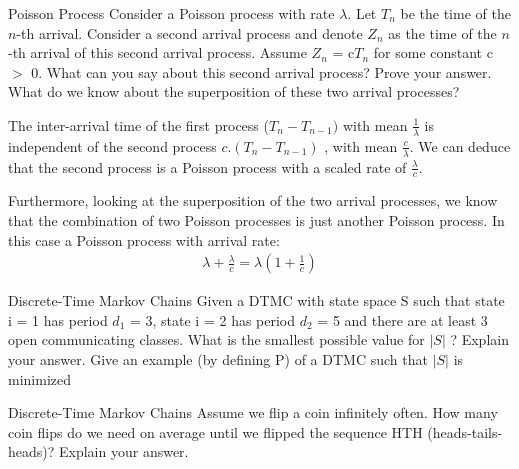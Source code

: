\begin{problem}{Poisson Process}
Consider a Poisson process with rate $\lambda$. Let $T_n$ be the time of the $n$-th arrival. Consider a second arrival process and denote $Z_n$ as the time of the $n$-th arrival of this second arrival process. Assume $Z_n$ = c$T_n$ for some constant c $>$ 0. What can you say about this second arrival process? Prove your answer. What do we know about the superposition of these two arrival processes?
\end{problem}

\begin{solution} 
The inter-arrival time of the first process ($T_n - T_{n-1})$ with mean $\frac{1}{\lambda}$ is independent of the second process $ c.(T_n - T_{n-1})$ , with mean $\frac{c}{\lambda}$. We can deduce that the second process is a Poisson process with a scaled rate of $\frac{\lambda}{c}$. 

Furthermore, looking at the superposition of the two arrival processes, we know that the combination of two Poisson processes is just another Poisson process. In this case a Poisson process with arrival rate:
\begin{align*}
    \lambda +\frac{\lambda}{c}= \lambda\left (1+\frac{1}{c}  \right )
\end{align*}
\end{solution}

\begin{problem}{Discrete-Time Markov Chains}
Given a DTMC with state space S such that state i = 1 has period $d_1$ = 3, state i = 2 has period $d_2$ = 5 and there are at least 3 open communicating classes. What is the smallest possible value for $| S |$  ? Explain your answer. Give an example (by defining P) of a DTMC such that $| S |$ is minimized
\end{problem}

\begin{problem}{Discrete-Time Markov Chains}
Assume we flip a coin infinitely often. How many coin flips do we need on average until we flipped the sequence HTH (heads-tails-heads)? Explain your answer.
\end{problem}

